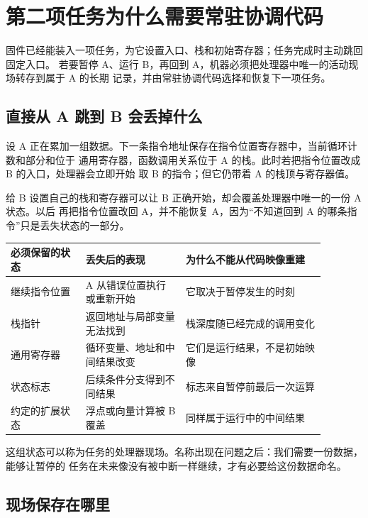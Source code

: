 \chapter{第二项任务为什么需要常驻协调代码}

\begin{keyidea}
固件已经能装入一项任务，为它设置入口、栈和初始寄存器；任务完成时主动跳回固定入口。
若要暂停 A、运行 B，再回到 A，机器必须把处理器中唯一的活动现场转存到属于 A 的长期
记录，并由常驻协调代码选择和恢复下一项任务。
\end{keyidea}

\section{直接从 A 跳到 B 会丢掉什么}

设 A 正在累加一组数据。下一条指令地址保存在指令位置寄存器中，当前循环计数和部分和位于
通用寄存器，函数调用关系位于 A 的栈。此时若把指令位置改成 B 的入口，处理器会立即开始
取 B 的指令；但它仍带着 A 的栈顶与寄存器值。

给 B 设置自己的栈和寄存器可以让 B 正确开始，却会覆盖处理器中唯一的一份 A 状态。以后
再把指令位置改回 A，并不能恢复 A，因为“不知道回到 A 的哪条指令”只是丢失状态的一部分。

\begin{longtable}{|L{0.21\linewidth}|L{0.28\linewidth}|L{0.39\linewidth}|}
\hline
{}
必须保留的状态 & 丢失后的表现 & 为什么不能从代码映像重建 \\ \hline
继续指令位置 & A 从错误位置执行或重新开始 & 它取决于暂停发生的时刻 \\ \hline
栈指针 & 返回地址与局部变量无法找到 & 栈深度随已经完成的调用变化 \\ \hline
通用寄存器 & 循环变量、地址和中间结果改变 & 它们是运行结果，不是初始映像 \\ \hline
状态标志 & 后续条件分支得到不同结果 & 标志来自暂停前最后一次运算 \\ \hline
约定的扩展状态 & 浮点或向量计算被 B 覆盖 & 同样属于运行中的中间结果 \\ \hline
\end{longtable}

这组状态可以称为任务的处理器现场。名称出现在问题之后：我们需要一份数据，能够让暂停的
任务在未来像没有被中断一样继续，才有必要给这份数据命名。

\section{现场保存在哪里}

